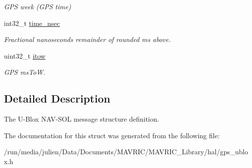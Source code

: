 \begin{DoxyCompactItemize}
\begin{DoxyCompactList}\small\item\em G\+P\+S week (G\+P\+S time) \end{DoxyCompactList}\item 
\hypertarget{structubx__nav__solution__t_a8a9544fcb51eee89ba52e44d27425be1}{int32\+\_\+t \hyperlink{structubx__nav__solution__t_a8a9544fcb51eee89ba52e44d27425be1}{time\+\_\+nsec}}\label{structubx__nav__solution__t_a8a9544fcb51eee89ba52e44d27425be1}

\begin{DoxyCompactList}\small\item\em Fractional nanoseconds remainder of rounded ms above. \end{DoxyCompactList}\item 
\hypertarget{structubx__nav__solution__t_a6609f5733f8c3f2423a5241757c80d6b}{uint32\+\_\+t \hyperlink{structubx__nav__solution__t_a6609f5733f8c3f2423a5241757c80d6b}{itow}}\label{structubx__nav__solution__t_a6609f5733f8c3f2423a5241757c80d6b}

\begin{DoxyCompactList}\small\item\em G\+P\+S ms\+To\+W. \end{DoxyCompactList}\end{DoxyCompactItemize}


\subsection{Detailed Description}
The U-\/\+Blox N\+A\+V-\/\+S\+O\+L message structure definition. 

The documentation for this struct was generated from the following file\+:\begin{DoxyCompactItemize}
\item 
/run/media/julien/\+Data/\+Documents/\+M\+A\+V\+R\+I\+C/\+M\+A\+V\+R\+I\+C\+\_\+\+Library/hal/gps\+\_\+ublox.\+h\end{DoxyCompactItemize}
